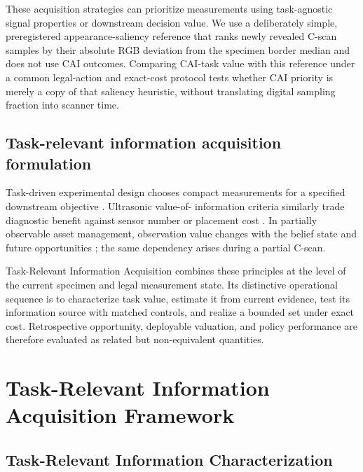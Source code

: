 \documentclass[preprint,12pt]{elsarticle}
\begin{document}
These acquisition strategies can prioritize measurements using task-agnostic
signal properties or downstream decision value. We use a deliberately simple,
preregistered appearance-saliency reference that ranks newly revealed C-scan
samples by their absolute RGB deviation from the specimen border median and
does not use CAI outcomes. Comparing CAI-task value with this reference under a
common legal-action and exact-cost protocol tests whether CAI priority is merely
a copy of that saliency heuristic, without translating digital sampling fraction
into scanner time.

\subsection{Task-relevant information acquisition formulation}
\label{sec:related-task}

Task-driven experimental design chooses compact measurements for a specified
downstream objective \cite{blumberg2024experimental}. Ultrasonic value-of-
information criteria similarly trade diagnostic benefit against sensor number
or placement cost \cite{cantero2020optimal}. In partially observable asset
management, observation value changes with the belief state and future
opportunities \cite{memarzadeh2016value}; the same dependency arises during a
partial C-scan.

Task-Relevant Information Acquisition combines these principles at the level
of the current specimen and legal measurement state. Its distinctive
operational sequence is to characterize task value, estimate it from current
evidence, test its information source with matched controls, and realize a
bounded set under exact cost. Retrospective opportunity, deployable valuation,
and policy performance are therefore evaluated as related but non-equivalent
quantities.

\section{Task-Relevant Information Acquisition Framework}
\label{sec:framework}

\subsection{Task-Relevant Information Characterization}
\label{sec:framework-characterization}
\end{document}
